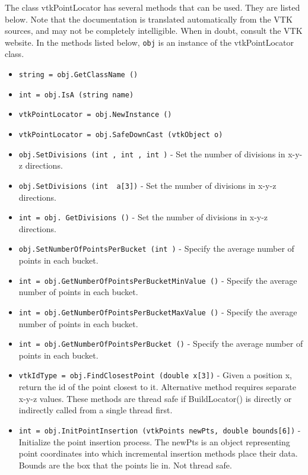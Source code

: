 The class vtkPointLocator has several methods that can be used.
  They are listed below.
Note that the documentation is translated automatically from the VTK sources,
and may not be completely intelligible.  When in doubt, consult the VTK website.
In the methods listed below, \verb|obj| is an instance of the vtkPointLocator class.
\begin{itemize}
\item  \verb|string = obj.GetClassName ()|

\item  \verb|int = obj.IsA (string name)|

\item  \verb|vtkPointLocator = obj.NewInstance ()|

\item  \verb|vtkPointLocator = obj.SafeDownCast (vtkObject o)|

\item  \verb|obj.SetDivisions (int , int , int )| -  Set the number of divisions in x-y-z directions.

\item  \verb|obj.SetDivisions (int  a[3])| -  Set the number of divisions in x-y-z directions.

\item  \verb|int = obj. GetDivisions ()| -  Set the number of divisions in x-y-z directions.

\item  \verb|obj.SetNumberOfPointsPerBucket (int )| -  Specify the average number of points in each bucket.

\item  \verb|int = obj.GetNumberOfPointsPerBucketMinValue ()| -  Specify the average number of points in each bucket.

\item  \verb|int = obj.GetNumberOfPointsPerBucketMaxValue ()| -  Specify the average number of points in each bucket.

\item  \verb|int = obj.GetNumberOfPointsPerBucket ()| -  Specify the average number of points in each bucket.

\item  \verb|vtkIdType = obj.FindClosestPoint (double x[3])| -  Given a position x, return the id of the point closest to it. Alternative
 method requires separate x-y-z values.
 These methods are thread safe if BuildLocator() is directly or
 indirectly called from a single thread first.

\item  \verb|int = obj.InitPointInsertion (vtkPoints newPts, double bounds[6])| -  Initialize the point insertion process. The newPts is an object
 representing point coordinates into which incremental insertion methods
 place their data. Bounds are the box that the points lie in.
 Not thread safe.


\end{itemize}
